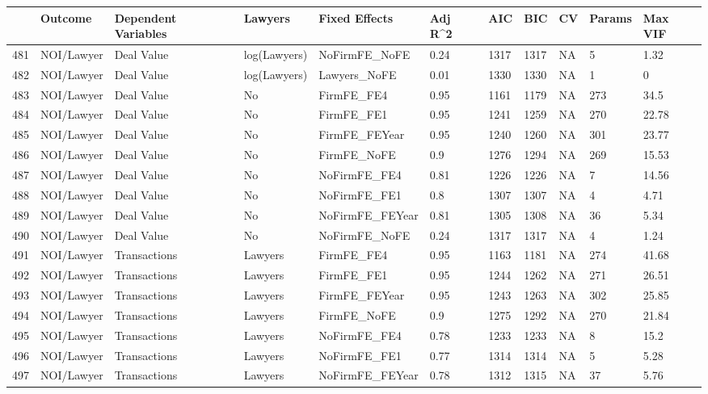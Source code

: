 \documentclass{article}
\begin{document}
\begin{table}[H]
\centering
\begin{tabular}{rllllllllll}
  \hline
 & Outcome & Dependent Variables & Lawyers & Fixed Effects & Adj R^2 & AIC & BIC & CV & Params & Max VIF \\ 
  \hline
481 & NOI/Lawyer & Deal Value & log(Lawyers) & NoFirmFE\_NoFE & 0.24 & 1317 & 1317 & NA & 5 & 1.32 \\ 
  482 & NOI/Lawyer & Deal Value & log(Lawyers) & Lawyers\_NoFE & 0.01 & 1330 & 1330 & NA & 1 & 0 \\ 
  483 & NOI/Lawyer & Deal Value & No & FirmFE\_FE4 & 0.95 & 1161 & 1179 & NA & 273 & 34.5 \\ 
  484 & NOI/Lawyer & Deal Value & No & FirmFE\_FE1 & 0.95 & 1241 & 1259 & NA & 270 & 22.78 \\ 
  485 & NOI/Lawyer & Deal Value & No & FirmFE\_FEYear & 0.95 & 1240 & 1260 & NA & 301 & 23.77 \\ 
  486 & NOI/Lawyer & Deal Value & No & FirmFE\_NoFE & 0.9 & 1276 & 1294 & NA & 269 & 15.53 \\ 
  487 & NOI/Lawyer & Deal Value & No & NoFirmFE\_FE4 & 0.81 & 1226 & 1226 & NA & 7 & 14.56 \\ 
  488 & NOI/Lawyer & Deal Value & No & NoFirmFE\_FE1 & 0.8 & 1307 & 1307 & NA & 4 & 4.71 \\ 
  489 & NOI/Lawyer & Deal Value & No & NoFirmFE\_FEYear & 0.81 & 1305 & 1308 & NA & 36 & 5.34 \\ 
  490 & NOI/Lawyer & Deal Value & No & NoFirmFE\_NoFE & 0.24 & 1317 & 1317 & NA & 4 & 1.24 \\ 
  491 & NOI/Lawyer & Transactions & Lawyers & FirmFE\_FE4 & 0.95 & 1163 & 1181 & NA & 274 & 41.68 \\ 
  492 & NOI/Lawyer & Transactions & Lawyers & FirmFE\_FE1 & 0.95 & 1244 & 1262 & NA & 271 & 26.51 \\ 
  493 & NOI/Lawyer & Transactions & Lawyers & FirmFE\_FEYear & 0.95 & 1243 & 1263 & NA & 302 & 25.85 \\ 
  494 & NOI/Lawyer & Transactions & Lawyers & FirmFE\_NoFE & 0.9 & 1275 & 1292 & NA & 270 & 21.84 \\ 
  495 & NOI/Lawyer & Transactions & Lawyers & NoFirmFE\_FE4 & 0.78 & 1233 & 1233 & NA & 8 & 15.2 \\ 
  496 & NOI/Lawyer & Transactions & Lawyers & NoFirmFE\_FE1 & 0.77 & 1314 & 1314 & NA & 5 & 5.28 \\ 
  497 & NOI/Lawyer & Transactions & Lawyers & NoFirmFE\_FEYear & 0.78 & 1312 & 1315 & NA & 37 & 5.76 \\ 

\end{tabular}
\end{table}
\end{document}
